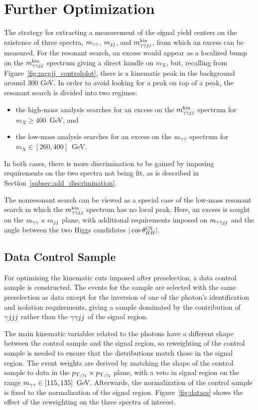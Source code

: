 \section{Further Optimization\label{sec:extraction}}

The strategy for extracting a measurement of the signal yield centers on the existence of
three spectra, $m_{\gamma\gamma}$, $m_{jj}$, and $m_{\gamma\gamma jj}^{\rm kin}$, from which an excess can be measured.
For the resonant search, an excess would appear as a localized bump on the
$m_{\gamma\gamma jj}^{\rm kin}$ spectrum giving a direct handle on $m_X$,
but, recalling from Figure~\ref{fig:mggjj_controlplot}, there is a kinematic peak in the background
around 300 GeV. In order to avoid looking for a peak on top of a peak, the resonant search is
divided into two regimes:
\begin{itemize}
\item the high-mass analysis searches for an excess on the $m_{\gamma\gamma jj}^{\rm kin}$ spectrum for $m_X \ge 400$~GeV, and
\item the low-mass analysis searches for an excess on the $m_{\gamma\gamma}$ spectrum for $m_X \in [260, 400]$~GeV.
\end{itemize}
In both cases, there is more discrimination to be gained by imposing requirements on the two spectra
not being fit, as is described in Section~\ref{subsec:add_discrimination}.

The nonresonant search can be viewed as a special case of the low-mass resonant search in which
the $m_{\gamma\gamma jj}^{\rm kin}$ spectrum has no local peak. Here, an excess is sought on the $m_{\gamma\gamma} \times m_{jj}$ plane,
with additional requirements imposed on $m_{\gamma\gamma jj}$ and the angle between the two Higgs candidates
$|\cos {\theta^{\rm CS}_{HH}}|$.

\subsection{Data Control Sample\label{subsec:dataCS}}

For optimizing the kinematic cuts imposed after preselection, a data control sample is constructed.
The events for the sample are selected with the same preselection as data except for
the inversion of one of the photon's identification and isolation requirements, giving a sample
dominated by the contribution of $\gamma jjj$ rather than the $\gamma\gamma jj$ of the signal region.

The main kinematic variables related to the photons have a different shape
between the control sample and the
signal region, so reweighting of the control sample is needed to ensure that the distributions
match those in the signal region. The event weights are derived by matching the shape
of the control sample to data in the $p_{{\rm T},\gamma_1} \times p_{{\rm T},\gamma_1}$ plane,
with a veto in signal region on the range $m_{\gamma\gamma} \in [115, 135]$~GeV. Afterwards,
the normalization of the control sample is fixed to the normalization of the signal
region. Figure~\ref{fig:datacs}
shows the effect of the reweighting on the three spectra of interest.

